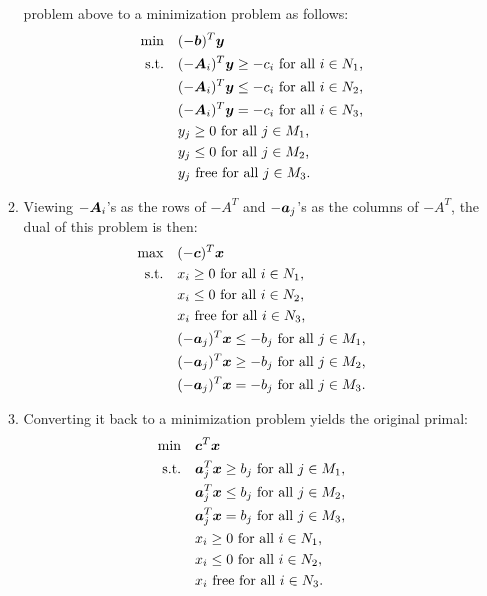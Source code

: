 \begin{enumerate}
\begin{enumerate}[label={(\arabic*)}]
problem above to a minimization problem as follows:
\begin{align*}
\text{min}\quad&(-\bm{b})^{T}\bm{y} \\
\text{s.t.}\quad&(-\bm{A}_i)^{T}\bm{y}\ge -c_i\text{ for all \(i\in N_1\),} \\
\quad&(-\bm{A}_i)^{T}\bm{y}\le -c_i\text{ for all \(i\in N_2\),} \\
\quad&(-\bm{A}_i)^{T}\bm{y}=-c_i\text{ for all \(i\in N_3\),} \\
\quad&y_j\ge 0 \text{ for all \(j\in M_1\),} \\
\quad&y_j\le 0 \text{ for all \(j\in M_2\),} \\
\quad&y_j\text{ free} \text{ for all \(j\in M_3\).}
\end{align*}
\item Viewing \(-\bm{A}_i\)'s as the rows of \(-A^{T}\) and \(-\bm{a}_j\)'s as
the columns of \(-A^{T}\), the dual of this problem is then:
\begin{align*}
\text{max}\quad&(-\bm{c})^{T}\bm{x} \\
\text{s.t.}\quad&x_i\ge 0\text{ for all \(i\in N_1\),} \\
\quad&x_i\le 0\text{ for all \(i\in N_2\),} \\
\quad&x_i\text{ free}\text{ for all \(i\in N_3\),} \\
\quad&(-\bm{a}_j)^{T}\bm{x}\le -b_j \text{ for all \(j\in M_1\),} \\
\quad&(-\bm{a}_j)^{T}\bm{x}\ge -b_j \text{ for all \(j\in M_2\),} \\
\quad&(-\bm{a}_j)^{T}\bm{x}=-b_j\text{ for all \(j\in M_3\).}
\end{align*}
\item Converting it back to a minimization problem yields the original primal:
\begin{align*}
\text{min}\quad&\bm{c}^{T}\bm{x} \\
\text{s.t.}\quad&\bm{a}_j^{T}\bm{x}\ge b_j \text{ for all \(j\in M_1\),} \\
\quad&\bm{a}_j^{T}\bm{x}\le b_j \text{ for all \(j\in M_2\),} \\
\quad&\bm{a}_j^{T}\bm{x}=b_j \text{ for all \(j\in M_3\),} \\
\quad&x_i\ge 0\text{ for all \(i\in N_1\),} \\
\quad&x_i\le 0\text{ for all \(i\in N_2\),} \\
\quad&x_i\text{ free}\text{ for all \(i\in N_3\).}
\end{align*}

\end{enumerate}
\end{enumerate}

